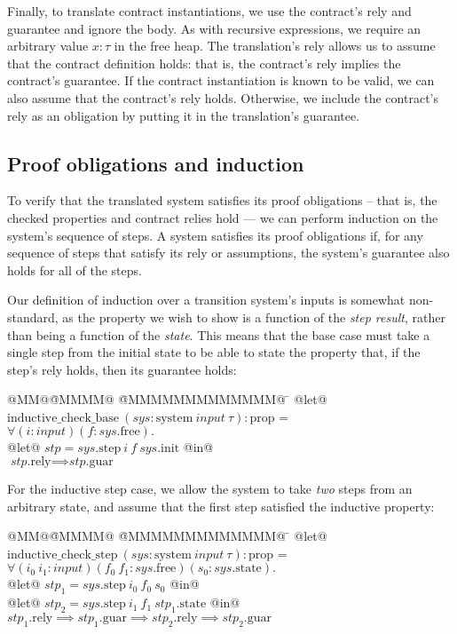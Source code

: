 Finally, to translate contract instantiations, we use the contract's rely and guarantee and ignore the body.
As with recursive expressions, we require an arbitrary value $x: \tau$ in the free heap.
The translation's rely allows us to assume that the contract definition holds: that is, the contract's rely implies the contract's guarantee.
If the contract instantiation is known to be valid, we can also assume that the contract's rely holds.
Otherwise, we include the contract's rely as an obligation by putting it in the translation's guarantee.

\subsection{Proof obligations and induction}
\label{s:transition:ind}

To verify that the translated system satisfies its proof obligations -- that is, the checked properties and contract relies hold --- we can perform induction on the system's sequence of steps.
A system satisfies its proof obligations if, for any sequence of steps that satisfy its rely or assumptions, the system's guarantee also holds for all of the steps.

Our definition of induction over a transition system's inputs is somewhat non-standard, as the property we wish to show is a function of the \emph{step result}, rather than being a function of the \emph{state}.
This means that the base case must take a single step from the initial state to be able to state the property that, if the step's rely holds, then its guarantee holds:
\begin{tabbing}
  @MM@\= @MMMM@ \= @MMMMMMMMMMMMM@ \= \kill
  @let@ $\text{inductive_check_base}~(\textit{sys}: \text{system}~\textit{input}~\tau): \text{prop}$ = \\
  \> $\forall (i: \textit{input}) (f: \textit{sys}\text{.free}).$ \\
  \> @let@ $\textit{stp} = \textit{sys}\text{.step}~ i~ f~ \textit{sys}\text{.init}$ @in@ \\
  \> $\textit{stp}\text{.rely} \implies \textit{stp}\text{.guar}$
\end{tabbing}

For the inductive step case, we allow the system to take \emph{two} steps from an arbitrary state, and assume that the first step satisfied the inductive property:
\begin{tabbing}
  @MM@\= @MMMM@ \= @MMMMMMMMMMMMM@ \= \kill
  @let@ $\text{inductive_check_step}~(\textit{sys}: \text{system}~\textit{input}~\tau): \text{prop}$ = \\
  \> $\forall (i_0~ i_1: \textit{input}) (f_0~ f_1: \textit{sys}\text{.free}) (s_0: \textit{sys}\text{.state}).$ \\
  \> @let@ $\textit{stp}_1 = \textit{sys}\text{.step}~ i_0~ f_0~ s_0$ @in@ \\
  \> @let@ $\textit{stp}_2 = \textit{sys}\text{.step}~ i_1~ f_1~ \textit{stp}_1\text{.state}$ @in@ \\
  \> $\textit{stp}_1\text{.rely} \implies \textit{stp}_1\text{.guar} \implies \textit{stp}_2\text{.rely} \implies \textit{stp}_2\text{.guar}$
\end{tabbing}

